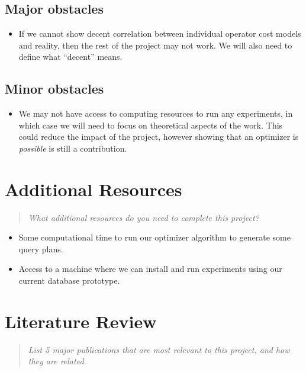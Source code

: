 \documentclass{proc}
\begin{document}
\subsection{Major obstacles} 

\begin{itemize}
  \item If we cannot show decent correlation between individual operator cost models and reality, then the rest of the project may not work.  We will also need to define what ``decent'' means.
\end{itemize}

\subsection{Minor obstacles}

\begin{itemize}
  \item We may not have access to computing resources to run any experiments, in which case we will need to focus on theoretical aspects of the work.  This could reduce the impact of the project, however showing that an optimizer is \emph{possible} is still a contribution.
\end{itemize}


\section{Additional Resources}
\begin{quote}
\emph{What additional resources do you need to complete this project?}
\end{quote}

\begin{itemize}
  \item Some computational time to run our optimizer algorithm to generate some query plans.
  \item Access to a machine where we can install and run experiments using our current database prototype.
 \end{itemize}
 
\section{Literature Review}
\begin{quote}
\emph{List 5 major publications that are most relevant to this project, and how they are related.}
\end{quote}
\end{document}

